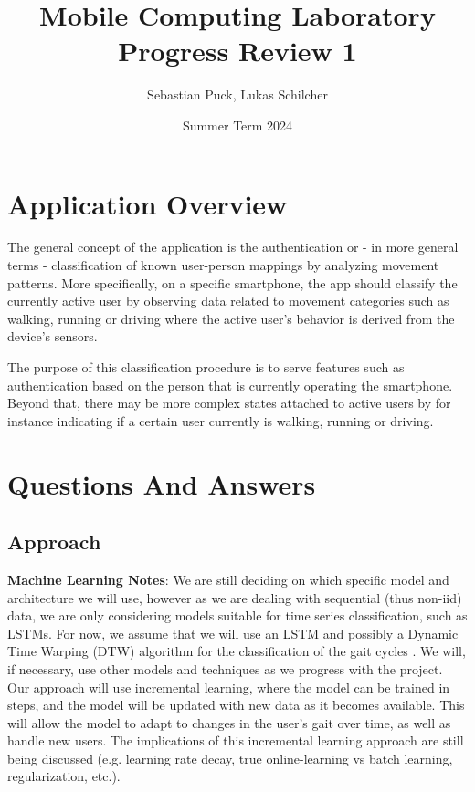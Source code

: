 \documentclass[a4paper,10pt]{article}
\author{Sebastian Puck, Lukas Schilcher}
\date{Summer Term 2024}
\title{Mobile Computing Laboratory\\Progress Review 1}
\begin{document}
\maketitle
\section{Application Overview}
The general concept of the application is the authentication or - in more general terms - classification of known user-person mappings by analyzing movement patterns. More specifically, on a specific smartphone, the app should classify the currently active user by observing data related to movement categories such as walking, running or driving where the active user's behavior is derived from the device's sensors.

The purpose of this classification procedure is to serve features such as authentication based on the person that is currently operating the smartphone. Beyond that, there may be more complex states attached to active users by for instance indicating if a certain user currently is walking, running or driving.

\section{Questions And Answers}

\subsection{Approach}
\textbf{Machine Learning Notes}: We are still deciding on which specific model and architecture we will use, however as we are dealing with sequential (thus non-iid) data, we are only considering models suitable for time series classification, such as LSTMs.
For now, we assume that we will use an LSTM and possibly a Dynamic Time Warping (DTW) algorithm for the classification of the gait cycles \cite{AVOLA2024103643}. We will, if necessary, use other models and techniques as we progress with the project.
Our approach will use incremental learning, where the model can be trained in steps, and the model will be updated with new data as it becomes available. This will allow the model to adapt to changes in the user's gait over time, as well as handle new users.
The implications of this incremental learning approach are still being discussed (e.g. learning rate decay, true online-learning vs batch learning, regularization, etc.).
\end{document}
